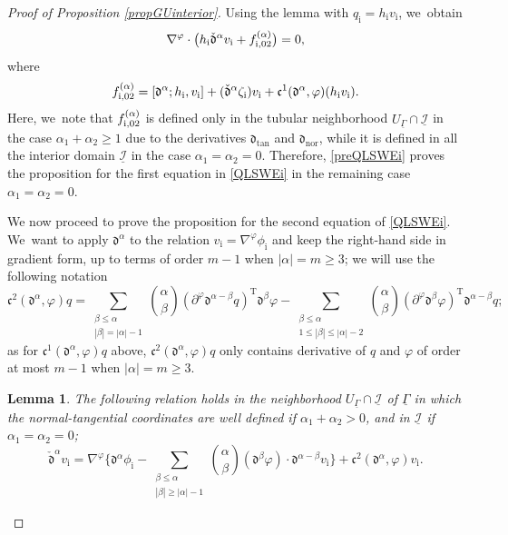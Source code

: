 \documentclass[10pt]{amsart}
\newcommand{\dtan}{{\mathfrak d}_\mathrm{tan}}
\newcommand{\dnor}{{\mathfrak d}_\mathrm{nor}}
\newcommand{\cI}{{\mathcal I}}
\newcommand{\ul}[1]{\underline{#1}}
\newcommand{\itGamma}{\mathit{\Gamma}}
\newcommand{\cmfalpha}{\check{\mathfrak{d}}^{\alpha}}
\newtheorem{lemma}[theorem]{Lemma}
\theoremstyle{definition}
\begin{document}
\begin{proof}[Proof of Proposition \ref{propGUinterior}]
Using the lemma with $q_\mathrm{i}=h_\mathrm{i}v_\mathrm{i}$, we~obtain
\begin{equation}\label{preQLSWEi}
\nabla^\varphi\cdot\bigl(h_\mathrm{i} \cmfalpha v_\mathrm{i} + f_{{\rm i},02}^{(\alpha)} \bigr)=0,
\end{equation}
where
\begin{equation}\label{deffi02}
f_{{\rm i},02}^{(\alpha)}
= [\mathfrak{d}^{\alpha}; h_\mathrm{i},v_\mathrm{i}] + (\cmfalpha \zeta_\mathrm{i})v_\mathrm{i} + \mathfrak{c}^1({\mathfrak d}^\alpha,\varphi)(h_\mathrm{i} v_\mathrm{i}).
\end{equation}
Here, we~note that $f_{{\rm i},02}^{(\alpha)}$ is defined only in the tubular neighborhood $U_{\ul{\itGamma}}\cap\ul{\cI}$ in the case $\alpha_1+\alpha_2\geq1$
due to the derivatives $\dtan$ and $\dnor$, while it is defined in all the interior domain $\ul{\cI}$ in the case $\alpha_1=\alpha_2=0$.
Therefore, \eqref{preQLSWEi} proves the proposition for the first equation in \eqref{QLSWEi} in the remaining case $\alpha_1=\alpha_2=0$.

We now proceed to prove the proposition for the second equation of \eqref{QLSWEi}. We~want to apply ${\mathfrak d}^\alpha$ to the relation $v_\mathrm{i}=\nabla^\varphi \phi_\mathrm{i}$ and keep the right-hand side in gradient form,
up to terms of order $m-1$ when $|\alpha|=m\geq 3$; we will use the following notation
\[
\mathfrak{c}^2({\mathfrak d}^\alpha,\varphi)q=
\sum_{\substack{\beta\leq\alpha\\ |\beta|=|\alpha|-1}} \binom{\alpha}{\beta} (\partial^\varphi\mathfrak{d}^{\alpha-\beta}q)^\mathrm{T}\mathfrak{d}^{\beta}\varphi
- \sum_{\substack{\beta\leq\alpha\\ 1\leq|\beta|\leq|\alpha|-2}} \binom{\alpha}{\beta}
(\partial^\varphi\mathfrak{d}^{\beta}\varphi)^\mathrm{T}\mathfrak{d}^{\alpha-\beta}q;
\]
as for $\mathfrak{c}^1({\mathfrak d}^\alpha,\varphi)q$ above,
$\mathfrak{c}^2({\mathfrak d}^\alpha,\varphi)q$ only contains derivative of $q$ and $\varphi$ of order at most $m-1$ when $\vert \alpha\vert=m\geq 3$.

\begin{lemma}
The following relation holds in the neighborhood $U_{\ul{\itGamma}}\cap \ul{\cI}$ of $\underline{\itGamma}$
in which the normal-tangential coordinates are well defined if $\alpha_1+\alpha_2>0$, and in $\ul{\cI}$ if $\alpha_1=\alpha_2=0$;
\begin{equation}\label{preQLSWEi2}
\cmfalpha v_\mathrm{i}= \nabla^\varphi\biggl\{ \mathfrak{d}^{\alpha}\phi_\mathrm{i}
- \sum_{\substack{\beta\leq\alpha\\ |\beta|\geq|\alpha|-1}} \binom{\alpha}{\beta} (\mathfrak{d}^{\beta}\varphi)\cdot\mathfrak{d}^{\alpha-\beta}v_\mathrm{i} \biggr\}
+\mathfrak{c}^2({\mathfrak d}^\alpha,\varphi)v_\mathrm{i}.
\end{equation}
\end{lemma}


\end{proof}
\end{document}
